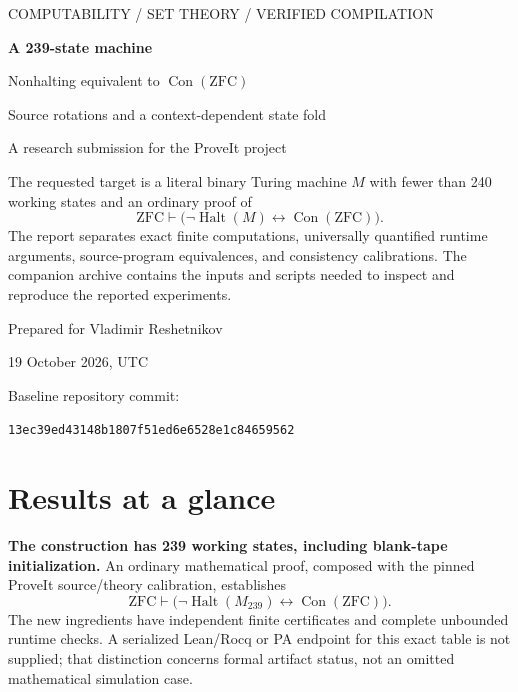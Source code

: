 \documentclass[11pt,a4paper]{article}
\theoremstyle{definition}
\newcommand{\ZFC}{\mathrm{ZFC}}
\newcommand{\Con}{\operatorname{Con}}
\newcommand{\Halt}{\operatorname{Halt}}
\newcommand{\pin}{13ec39ed43148b1807f51ed6e6528e1c84659562}
\begin{document}
\begin{titlepage}
\vspace*{12mm}
{\large\color{teal}COMPUTABILITY / SET THEORY / VERIFIED COMPILATION\par}
\vspace{14mm}
{\Huge\bfseries\color{navy}A 239-state machine\par}
\vspace{5mm}
{\LARGE Nonhalting equivalent to $\Con(\ZFC)$\par}
\vspace{3mm}
{\large Source rotations and a context-dependent state fold\par}
\vspace{9mm}
{\large A research submission for the ProveIt project\par}
\vspace{12mm}
The requested target is a literal binary Turing machine $M$ with fewer than
240 working states and an ordinary proof of
\[
 \ZFC\vdash\bigl(\neg\Halt(M)\leftrightarrow\Con(\ZFC)\bigr).
\]
The report separates exact finite computations, universally quantified
runtime arguments, source-program equivalences, and consistency calibrations.
The companion archive contains the inputs and scripts needed to inspect and
reproduce the reported experiments.
\vfill

\vfill
{\large Prepared for Vladimir Reshetnikov\par}
{19 October 2026, UTC\par}
\vspace{5mm}
{\small Baseline repository commit:\par
\texttt{\pin}\par}
\end{titlepage}

\tableofcontents
\newpage
{}

\section*{Results at a glance}

\textbf{The construction has 239 working states, including blank-tape
initialization.}  An ordinary mathematical proof, composed with the pinned
ProveIt source/theory calibration, establishes
\[
 \ZFC\vdash\bigl(\neg\Halt(M_{239})\leftrightarrow\Con(\ZFC)\bigr).
\]
The new ingredients have independent finite certificates and complete
unbounded runtime checks.  A serialized Lean/Rocq or PA endpoint for this
exact table is not supplied; that distinction concerns formal artifact
status, not an omitted mathematical simulation case.
\end{document}
